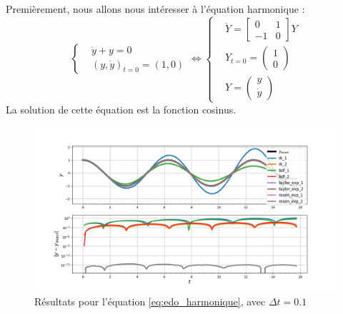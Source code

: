     \paragraph{}
    Premièrement, nous allons nous intéresser à l'équation harmonique :
    \begin{equation}
        \left\{
        \begin{aligned}
            &\ddot{y} + y = 0 \\
            &\left(y, \dot{y}\right)_{t = 0} = \left(1, 0\right)
        \end{aligned}
        \right.
        \Longleftrightarrow
        \left\{
        \begin{aligned}
            &\dot{Y} = \begin{bmatrix}0 & 1\\-1 & 0\end{bmatrix}Y \\
            &Y_{t = 0} = \begin{pmatrix}1\\0\end{pmatrix}\\
            &Y = \begin{pmatrix}y\\\dot{y}\end{pmatrix}
        \end{aligned}
        \right.
    \label{eq:edo_harmonique}
    \end{equation}
    La solution de cette équation est la fonction cosinus.
    \begin{figure}
        \centering
        \includegraphics[width=\textwidth]{images/results/edo_sine.png}
        \caption{Résultats pour l'équation \ref{eq:edo_harmonique}, avec $\Delta t = 0.1$}
        \label{fig:edo_harmonique}
    \end{figure}

